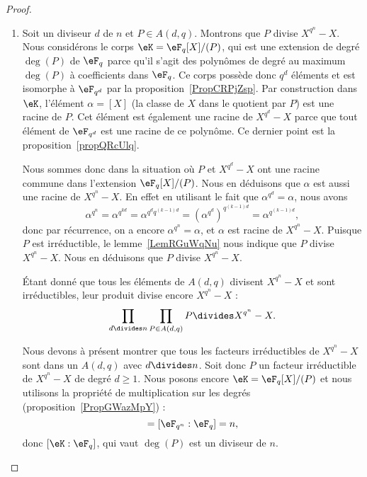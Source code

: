 \begin{proof}
	\begin{enumerate}
		\item
		      Soit un diviseur \( d\) de \( n\) et \( P\in A(d,q)\). Montrons que \( P\) divise \( X^{q^n}-X\). Nous considérons le corps \( \eK=\eF_q[X]/(P)\), qui est une extension de degré \( \deg(P)\) de \( \eF_q\) parce qu'il s'agit des polynômes de degré au maximum \( \deg(P)\) à coefficients dans \( \eF_q\). Ce corps possède donc \( q^d\) éléments et est isomorphe à \( \eF_{q^d}\) par la proposition~\ref{PropCRPjZsp}. Par construction dans \( \eK\), l'élément \( \alpha=[X]\) (la classe de \( X\) dans le quotient par \( P\)) est une racine de \( P\). Cet élément est également une racine de \( X^{q^d}-X\) parce que tout élément de \( \eF_{q^d}\) est une racine de ce polynôme. Ce dernier point est la proposition~\ref{propQRcUlq}.

		      Nous sommes donc dans la situation où \( P\) et \( X^{q^d}-X\) ont une racine commune dans l'extension \( \eF_q[X]/(P)\). Nous en déduisons que \( \alpha\) est aussi une racine de \( X^{q^n}-X\). En effet en utilisant le fait que \( \alpha^{q^d}=\alpha\), nous avons
		      \begin{equation}
			      \alpha^{q^n}=\alpha^{q^{kd}}=\alpha^{q^dq^{(k-1)d}}=\left( \alpha^{q^d} \right)^{q^{(k-1)d}}=\alpha^{q^{(k-1)d}},
		      \end{equation}
		      donc par récurrence, on a encore \( \alpha^{q^n}=\alpha\), et \( \alpha\) est racine de \( X^{q^n}-X\). Puisque \( P\) est irréductible, le lemme~\ref{LemRGuWqNu} nous indique que \( P\) divise \( X^{q^n}-X\). Nous en déduisons que \( P\) divise \( X^{q^n}-X\).

		      Étant donné que tous les éléments de \( A(d,q)\) divisent \( X^{q^n}-X\) et sont irréductibles, leur produit divise encore \( X^{q^n}-X\) :
		      \begin{equation}
			      \prod_{d\divides n}\prod_{P\in A(d,q)}P\divides X^{q^n}-X.
		      \end{equation}

		      Nous devons à présent montrer que tous les facteurs irréductibles de \( X^{q^n}-X\) sont dans un \( A(d,q)\) avec \( d\divides n\). Soit donc \( P\) un facteur irréductible de \( X^{q^n}-X\) de degré \( d\geq 1\). Nous posons encore \( \eK=\eF_q[X]/(P)\) et nous utilisons la propriété de multiplication sur les degrés (proposition~\ref{PropGWazMpY}) :
		      \begin{equation}
			      [\eF_{q^n}:\eK][\eK:\eF_q]=[\eF_{q^n}:\eF_q]=n,
		      \end{equation}
		      donc \( [\eK:\eF_q]\), qui vaut \( \deg(P)\) est un diviseur de \( n\).


\end{enumerate}
\end{proof}
